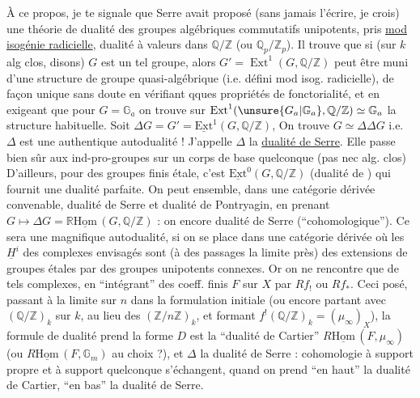 À ce propos, je te signale que Serre avait proposé (sans jamais l'écrire, je crois) une théorie de dualité des groupes algébriques commutatifs unipotents,  pris \uline{mod isogénie radicielle}, dualité à valeurs dans $\mathbb{Q}/\mathbb{Z}$ (ou $\mathbb{Q}_p/\mathbb{Z}_p$). Il trouve que si (sur $k$ alg clos, disons) $G$ est un tel groupe, alors $G'=\operatorname{Ext}^{1}(G,\mathbb{Q}/\mathbb{Z})$ peut être muni  d'une structure de groupe quasi-algébrique (i.e. défini mod isog. radicielle), de façon unique sans doute en vérifiant qques propriétés de fonctorialité, et en exigeant que pour $G=\mathbb{G}_a$ on trouve sur $\operatorname{Ext}^{1}(\unsure{G_a|\mathbb{G}_a},\mathbb{Q}/\mathbb{Z})\simeq\mathbb{G}_a$ la structure habituelle. Soit $\Delta G=G'=\underline{\mathrm{Ext}}^{1}(G,\mathbb{Q}/\mathbb{Z})$, On trouve $G\simeq\Delta\Delta G$ i.e. $\Delta$ est une authentique autodualité ! J'appelle $\Delta$ la \uline{dualité de Serre}. Elle passe bien sûr aux ind-pro-groupes sur un corps de base quelconque (pas nec alg. clos)  D'ailleurs, pour des groupes finis étale, c'est $\underline{\mathrm{Ext}}^{0}(G,\mathbb{Q}/\mathbb{Z})$ (dualité de ) qui fournit une dualité parfaite. On peut  ensemble, dans une catégorie dérivée convenable, dualité de Serre et dualité de Pontryagin, en prenant
$G\longmapsto\Delta G=\mathbb{R}\underline{\mathrm{Hom}}\,(G,\mathbb{Q}/\mathbb{Z})$ : on  encore dualité de Serre (``cohomologique''). Ce sera une magnifique autodualité, si on se place dans une catégorie dérivée où les $\underline{H}^{i}$ des complexes envisagés sont (à des passages  la limite près) des extensions de groupes étales par des groupes unipotents connexes. Or on ne rencontre que de tels complexes, en ``intégrant'' des coeff. finis $F$ sur $X$ par $Rf_!$ ou $Rf_*$. Ceci posé, passant à la limite sur $n$ dans la formulation initiale (ou encore partant avec $(\mathbb{Q}/\mathbb{Z})_k$ sur $k$, au lieu des $(\mathbb{Z}/n\mathbb{Z})_k$, et formant $f^!(\mathbb{Q}/\mathbb{Z})_k=(\mu_\infty)_X$), la formule de dualité prend la forme
 $D$ est la ``dualité de Cartier'' $R\underline{\mathrm{Hom}}\,(F,\mu_\infty)$ (ou $R\underline{\mathrm{Hom}}\,(F,\mathbb{G}_m)$ au choix ?), et $\Delta$ la dualité de Serre : cohomologie à support propre et à support quelconque s'échangent, quand on prend ``en haut'' la dualité de Cartier, ``en bas'' la dualité de Serre.

